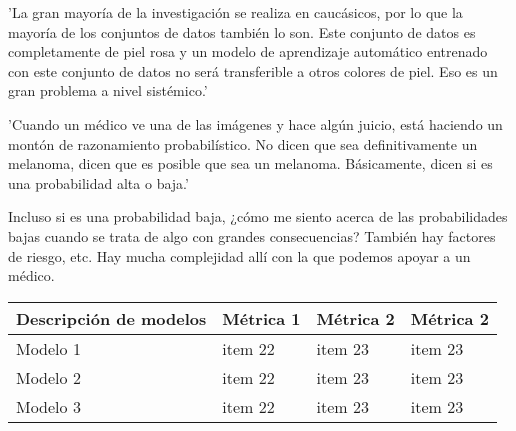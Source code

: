 'La gran mayoría de la investigación se realiza en caucásicos, por lo que la mayoría de los conjuntos de datos también lo son. Este conjunto de datos es completamente de piel rosa y un modelo de aprendizaje automático entrenado con este conjunto de datos no será transferible a otros colores de piel. Eso es un gran problema a nivel sistémico.'

'Cuando un médico ve una de las imágenes y hace algún juicio, está haciendo un montón de razonamiento probabilístico. No dicen que sea definitivamente un melanoma, dicen que es posible que sea un melanoma.
Básicamente, dicen si es una probabilidad alta o baja.'

Incluso si es una probabilidad baja, ¿cómo me siento acerca de las probabilidades bajas cuando se trata de algo con grandes consecuencias?
También hay factores de riesgo, etc. Hay mucha complejidad allí con la que podemos apoyar a un médico.

\begin{center}    
\begin{tabularx}{0.9\textwidth} { 
  | >{\centering\arraybackslash}X 
  | >{\centering\arraybackslash}X 
  | >{\centering\arraybackslash}X
  | >{\centering\arraybackslash}X |}
 \hline
 Descripción de modelos & Métrica 1 & Métrica 2 & Métrica 2 \\
 \hline
 Modelo 1  & item 22  & item 23 & item 23 \\
 \hline
 Modelo 2  & item 22  & item 23 & item 23 \\
 \hline
 Modelo 3  & item 22  & item 23 & item 23 \\
 \hline
\end{tabularx}
\end{center}